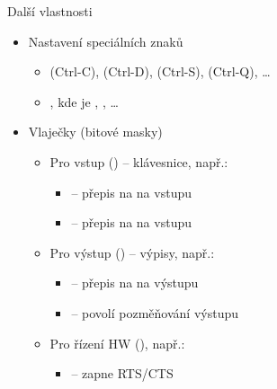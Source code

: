 \begin{frame}[fragile]{Další vlastnosti}

  \begin{itemize}
    \item Nastavení speciálních znaků
    \begin{itemize}
      \item {} (Ctrl-C),  (Ctrl-D),  (Ctrl-S),
         (Ctrl-Q), \dots

      \pause

      \item {}, kde  je ,
	, \dots
    \end{itemize}

    \pause

    \item Vlaječky (bitové masky)
    \begin{itemize}
      \item Pro vstup () -- klávesnice, např.:
      \begin{itemize}
	\item {} -- přepis \code{\\n} na \code{\\r} na vstupu
	\item {} -- přepis \code{\\r} na \code{\\n} na vstupu
      \end{itemize}

      \pause

      \item Pro výstup () -- výpisy, např.:
      \begin{itemize}
	\item {} -- přepis \code{\\n} na \code{\\r\\n} na výstupu
	\item {} -- povolí pozměňování výstupu
      \end{itemize}

      \pause

      \item Pro řízení HW (), např.:
      \begin{itemize}
	\item {} -- zapne RTS/CTS
      \end{itemize}


\end{itemize}
\end{itemize}
\end{frame}
